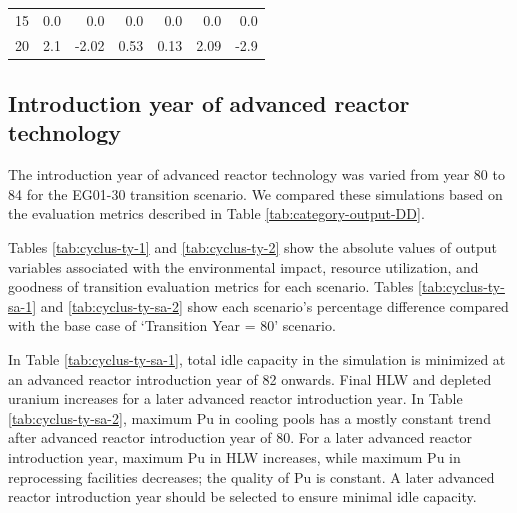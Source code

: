 \begin{table}[]
\begin{tabularx}{\textwidth}{R|RRRRRR}
        15 & 0.0              & 0.0                            & 0.0           & 0.0                         & 0.0               & 0.0                             \\
        20 & 2.1              & -2.02                          & 0.53          & 0.13                        & 2.09              & -2.9                           \\ \hline
                           \end{tabularx}%
    
    \end{table}


\subsection{Introduction year of advanced reactor technology}
The introduction year of advanced reactor technology
was varied from year 80 to 84 for the \Cyclus 
EG01-30 transition scenario. 
We compared these simulations based on the evaluation 
metrics described in Table \ref{tab:category-output-DD}.

Tables \ref{tab:cyclus-ty-1} and \ref{tab:cyclus-ty-2} show 
the absolute values of 
output variables associated with the environmental impact, 
resource utilization, and goodness of transition evaluation 
metrics for each scenario. 
Tables \ref{tab:cyclus-ty-sa-1} and \ref{tab:cyclus-ty-sa-2} 
show each scenario's percentage 
difference compared with the base case of `Transition Year = 80'
scenario. 

In Table \ref{tab:cyclus-ty-sa-1}, total idle capacity 
in the simulation is minimized at an advanced reactor 
introduction year of 82 onwards. 
Final HLW and depleted uranium increases for a later 
advanced reactor introduction year.
In Table \ref{tab:cyclus-ty-sa-2}, maximum Pu in cooling 
pools has a mostly constant trend after advanced reactor 
introduction year of 80. 
For a later advanced reactor introduction year, 
maximum Pu in HLW increases, while maximum Pu in reprocessing facilities 
decreases; the quality of Pu is constant. 
A later advanced reactor introduction year should be 
selected to ensure minimal idle capacity.


